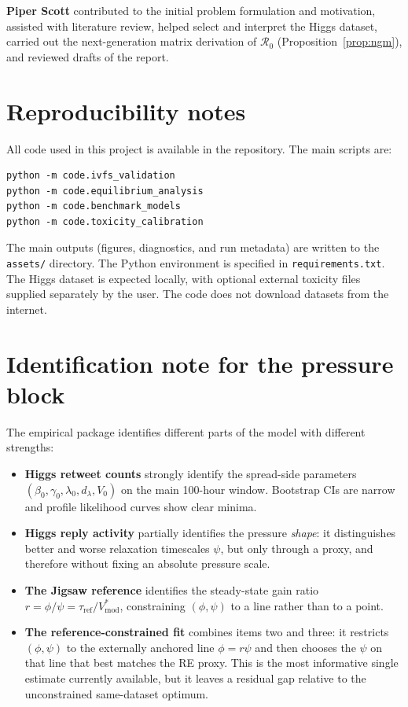 \documentclass[11pt]{article}
\begin{document}
\textbf{Piper Scott} contributed to the initial problem formulation and motivation, assisted with literature review, helped select and interpret the Higgs dataset, carried out the next-generation matrix derivation of $\mathcal{R}_0$ (Proposition~\ref{prop:ngm}), and reviewed drafts of the report.


\newpage
\appendix

\section{Reproducibility notes}
\label{app:repro}

All code used in this project is available in the repository. The main scripts are:
\begin{verbatim}
python -m code.ivfs_validation
python -m code.equilibrium_analysis
python -m code.benchmark_models
python -m code.toxicity_calibration
\end{verbatim}
The main outputs (figures, diagnostics, and run metadata) are written to the \texttt{assets/} directory. The Python environment is specified in \texttt{requirements.txt}. The Higgs dataset is expected locally, with optional external toxicity files supplied separately by the user. The code does not download datasets from the internet.

\section{Identification note for the pressure block}
\label{app:ident}

The empirical package identifies different parts of the model with different strengths:
\begin{itemize}[leftmargin=1.5em]
    \item \textbf{Higgs retweet counts} strongly identify the spread-side parameters $(\beta_0, \gamma_0, \lambda_0, d_\lambda, V_0)$ on the main 100-hour window. Bootstrap CIs are narrow and profile likelihood curves show clear minima.

    \item \textbf{Higgs reply activity} partially identifies the pressure \emph{shape}: it distinguishes better and worse relaxation timescales $\psi$, but only through a proxy, and therefore without fixing an absolute pressure scale.

    \item \textbf{The Jigsaw reference} identifies the steady-state gain ratio $r = \phi/\psi = \tau_{\mathrm{ref}} / V^*_{\mathrm{mod}}$, constraining $(\phi, \psi)$ to a line rather than to a point.

    \item \textbf{The reference-constrained fit} combines items two and three: it restricts $(\phi, \psi)$ to the externally anchored line $\phi = r\psi$ and then chooses the $\psi$ on that line that best matches the RE proxy. This is the most informative single estimate currently available, but it leaves a residual gap relative to the unconstrained same-dataset optimum.
\end{itemize}
\end{document}
